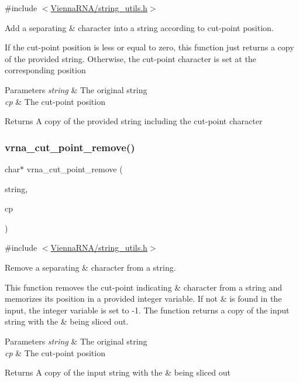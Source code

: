 {\ttfamily \#include $<$\mbox{\hyperlink{string__utils_8h}{Vienna\+R\+N\+A/string\+\_\+utils.\+h}}$>$}



Add a separating \textquotesingle{}\&\textquotesingle{} character into a string according to cut-\/point position. 

If the cut-\/point position is less or equal to zero, this function just returns a copy of the provided string. Otherwise, the cut-\/point character is set at the corresponding position


\begin{DoxyParams}{Parameters}
{\em string} & The original string \\
\hline
{\em cp} & The cut-\/point position \\
\hline
\end{DoxyParams}
\begin{DoxyReturn}{Returns}
A copy of the provided string including the cut-\/point character 
\end{DoxyReturn}
\mbox{\label{group__string__utils_ga1fbd821d4408cc5f1dd9d12c15e092cb}} 
\subsubsection{\texorpdfstring{vrna\+\_\+cut\+\_\+point\+\_\+remove()}{vrna\_cut\_point\_remove()}}
{\footnotesize\ttfamily char$\ast$ vrna\+\_\+cut\+\_\+point\+\_\+remove (\begin{DoxyParamCaption}\item[{const char $\ast$}]{string,  }\item[{int $\ast$}]{cp }\end{DoxyParamCaption})}



{\ttfamily \#include $<$\mbox{\hyperlink{string__utils_8h}{Vienna\+R\+N\+A/string\+\_\+utils.\+h}}$>$}



Remove a separating \textquotesingle{}\&\textquotesingle{} character from a string. 

This function removes the cut-\/point indicating \textquotesingle{}\&\textquotesingle{} character from a string and memorizes its position in a provided integer variable. If not \textquotesingle{}\&\textquotesingle{} is found in the input, the integer variable is set to -\/1. The function returns a copy of the input string with the \textquotesingle{}\&\textquotesingle{} being sliced out.


\begin{DoxyParams}{Parameters}
{\em string} & The original string \\
\hline
{\em cp} & The cut-\/point position \\
\hline
\end{DoxyParams}
\begin{DoxyReturn}{Returns}
A copy of the input string with the \textquotesingle{}\&\textquotesingle{} being sliced out 
\end{DoxyReturn}
